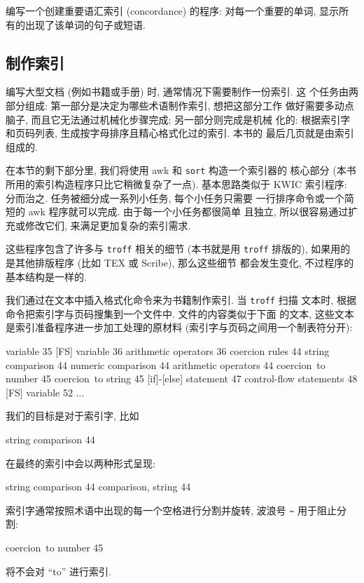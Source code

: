 \begin{exercise}
    编写一个创建重要语汇索引 (concordance) 的程序: 对每一个重要的单词,
    显示所有的出现了该单词的句子或短语.
\end{exercise}

\subsection{制作索引}
\label{subsec:making_indexes}

编写大型文档 (例如书籍或手册) 时, 通常情况下需要制作一份索引. 这
个任务由两部分组成: 第一部分是决定为哪些术语制作索引, 想把这部分工作
做好需要多动点脑子, 而且它无法通过机械化步骤完成; 另一部分则完成是机械
化的: 根据索引字和页码列表, 生成按字母排序且精心格式化过的索引. 本书的
最后几页就是由索引组成的.

在本节的剩下部分里, 我们将使用 awk 和 \texttt{sort} 构造一个索引器的
核心部分 (本书所用的索引构造程序只比它稍微复杂了一点). 基本思路类似于
KWIC 索引程序: 分而治之. 任务被细分成一系列小任务, 每个小任务只需要
一行排序命令或一个简短的 awk 程序就可以完成. 由于每一个小任务都很简单
且独立, 所以很容易通过扩充或修改它们, 来满足更加复杂的索引需求.

这些程序包含了许多与 \texttt{troff} 相关的细节 (本书就是用 \texttt{troff}
排版的), 如果用的是其他排版程序 (比如 TEX 或 Scribe), 那么这些细节
都会发生变化, 不过程序的基本结构是一样的.

我们通过在文本中插入格式化命令来为书籍制作索引. 当 \texttt{troff} 扫描
文本时, 根据命令把索引字与页码搜集到一个文件中. 文件的内容类似于下面
的文本, 这些文本是索引准备程序进一步加工处理的原材料
(索引字与页码之间用一个制表符分开):
%
\begin{awkcode}
    [FS] variable       35
    [FS] variable       36
    arithmetic operators        36
    coercion rules      44
    string comparison   44
    numeric comparison  44
    arithmetic operators        44
    coercion~to number  45
    coercion~to string  45
    [if]-[else] statement       47
    control-flow statements     48
    [FS] variable       52
    ...
\end{awkcode}
我们的目标是对于索引字, 比如
\begin{awkcode}
    string comparison       44
\end{awkcode}
在最终的索引中会以两种形式呈现:
\begin{awkcode}
    string comparison 44
    comparison, string 44
\end{awkcode}
索引字通常按照术语中出现的每一个空格进行分割并旋转, 波浪号 \verb'~'
用于阻止分割:
\begin{awkcode}
    coercion~to number      45
\end{awkcode}
将不会对 ``to'' 进行索引.

